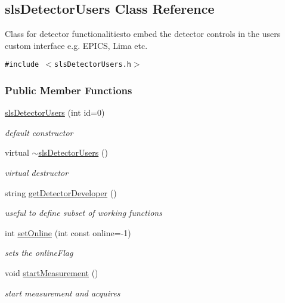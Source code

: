 \hypertarget{classslsDetectorUsers}{
\subsection{sls\-Detector\-Users Class Reference}
\label{classslsDetectorUsers}
}
Class for detector functionalitiesto embed the detector controls in the users custom interface e.g. EPICS, Lima etc.  


{\tt \#include $<$sls\-Detector\-Users.h$>$}

\subsubsection*{Public Member Functions}
\begin{CompactItemize}
\item 
\hyperlink{classslsDetectorUsers_17323cd635b9e5c2916be3ca30ec748c}{sls\-Detector\-Users} (int id=0)
\begin{CompactList}\small\item\em default constructor \item\end{CompactList}\item 
virtual \hyperlink{classslsDetectorUsers_0d1daf6539befe56d6e3df0b24f5d68b}{$\sim$sls\-Detector\-Users} ()
\begin{CompactList}\small\item\em virtual destructor \item\end{CompactList}\item 
string \hyperlink{classslsDetectorUsers_30c2ba51c33cc914f290a0b7891da4ec}{get\-Detector\-Developer} ()
\begin{CompactList}\small\item\em useful to define subset of working functions \item\end{CompactList}\item 
int \hyperlink{classslsDetectorUsers_ee622153ebd6b0dad065d95b07221955}{set\-Online} (int const online=-1)
\begin{CompactList}\small\item\em sets the online\-Flag \item\end{CompactList}\item 
void \hyperlink{classslsDetectorUsers_a34810bb0e872fdf929ebe62d8582bd3}{start\-Measurement} ()
\begin{CompactList}\small\item\em start measurement and acquires \item\end{CompactList}\item 

\end{CompactItemize}
